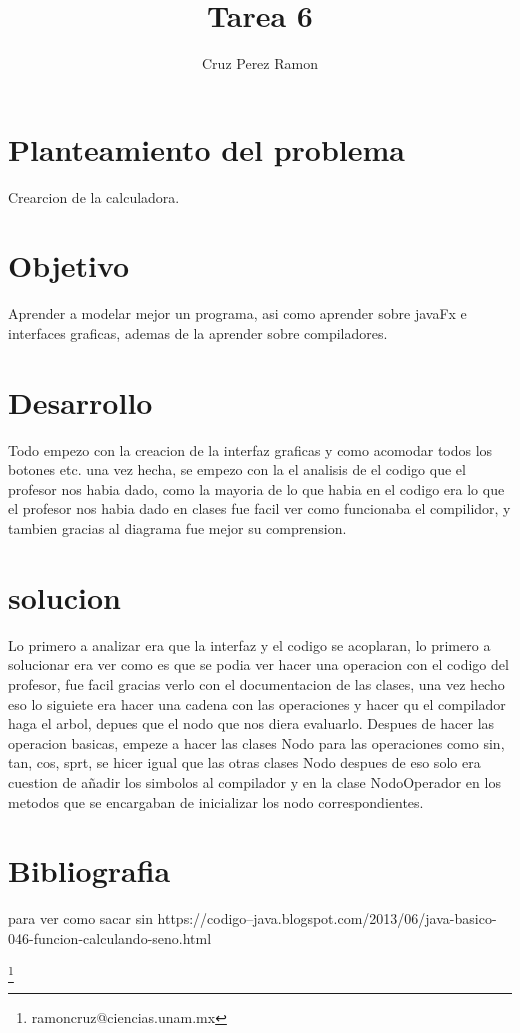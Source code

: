 \documentclass[12pt]{article}
\title{Tarea 6}
\author{Cruz Perez Ramon}
\begin{document}
\maketitle

\section{Planteamiento del problema}
Crearcion de la calculadora.

\section{Objetivo}
Aprender a modelar mejor un programa, asi como aprender sobre javaFx e interfaces graficas,
ademas de la aprender sobre compiladores.

\section{Desarrollo}
Todo empezo con la creacion de la interfaz graficas y como acomodar todos los botones etc. una vez hecha, se empezo con la el analisis de el codigo que el profesor nos habia dado, como la mayoria de lo que habia en el codigo era lo que el profesor nos habia dado en clases fue facil ver como funcionaba el compilidor, y tambien gracias al diagrama fue mejor su comprension.

\section{solucion}
Lo primero a analizar era que la interfaz y el codigo se acoplaran, lo primero a solucionar era ver como es que se podia ver hacer una operacion con el codigo del profesor, fue facil gracias verlo con el documentacion de las clases, una vez hecho eso lo siguiete era hacer una cadena con las operaciones y hacer qu el compilador haga el arbol, depues que el nodo que nos diera evaluarlo. Despues de hacer las operacion basicas, empeze a hacer las clases Nodo para las operaciones como sin, tan, cos, sprt, se hicer igual que las otras clases Nodo despues de eso solo era cuestion de añadir los simbolos al compilador y en la clase NodoOperador en los metodos que se encargaban de inicializar los nodo correspondientes.

\section{Bibliografia}
para ver como sacar sin 
https://codigo--java.blogspot.com/2013/06/java-basico-046-funcion-calculando-seno.html

\footnote{ramoncruz@ciencias.unam.mx}
\end{document}
